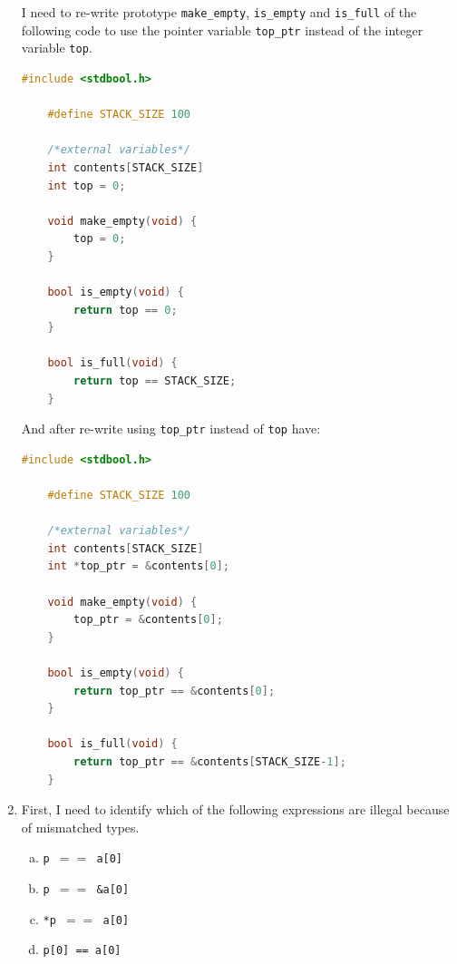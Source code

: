 \documentclass[12pt]{article}
\begin{document}
\begin{enumerate}[1.]
    I need to re-write prototype \texttt{make\_empty}, \texttt{is\_empty} and \texttt{is\_full}
    of the following code to use the pointer variable \texttt{top\_ptr} instead of the integer
    variable \texttt{top}.

    \bigskip

\begin{lstlisting}[language=c]
    #include <stdbool.h>

    #define STACK_SIZE 100

    /*external variables*/
    int contents[STACK_SIZE]
    int top = 0;

    void make_empty(void) {
        top = 0;
    }

    bool is_empty(void) {
        return top == 0;
    }

    bool is_full(void) {
        return top == STACK_SIZE;
    }
\end{lstlisting}

    \bigskip

    And after re-write using \texttt{top\_ptr} instead of \texttt{top} have:


\begin{lstlisting}[language=c]
    #include <stdbool.h>

    #define STACK_SIZE 100

    /*external variables*/
    int contents[STACK_SIZE]
    int *top_ptr = &contents[0];

    void make_empty(void) {
        top_ptr = &contents[0];
    }

    bool is_empty(void) {
        return top_ptr == &contents[0];
    }

    bool is_full(void) {
        return top_ptr == &contents[STACK_SIZE-1];
    }
\end{lstlisting}

    \item

    First, I need to identify which of the following expressions are illegal
    because of mismatched types.

    \bigskip

    \begin{enumerate}[a)]
        \item \texttt{p $==$ a[0]}
        \item \texttt{p $==$ \&a[0]}
        \item \texttt{*p $==$ a[0]}
        \item \texttt{p[0] == a[0]}
    \end{enumerate}


\end{enumerate}
\end{document}
